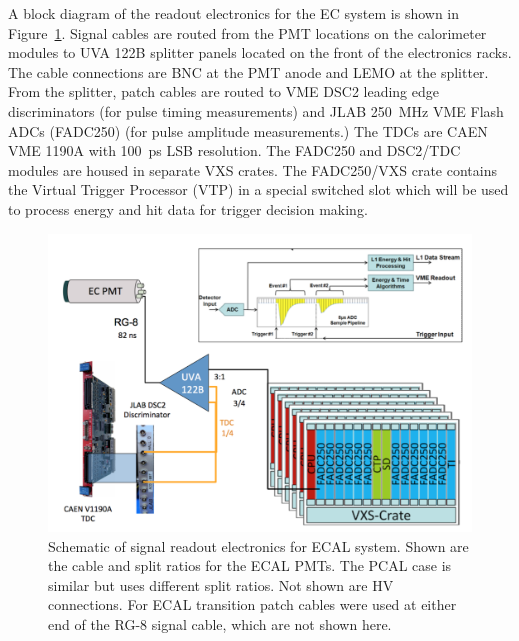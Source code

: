 \documentclass[letterpaper,10pt]{article}
\begin{document}
\newpage

A block diagram of the readout electronics for the EC system is shown in 
Figure~\ref{readout-elec}. Signal cables are routed from the PMT locations on the calorimeter
modules to UVA 122B splitter panels located on the front of the electronics racks. The cable
connections are BNC at the PMT anode and LEMO at the splitter.  From the splitter, patch cables
are routed to VME DSC2 leading edge discriminators (for pulse timing measurements) and JLAB 250~MHz VME Flash
ADCs (FADC250) (for pulse amplitude measurements.)  The TDCs are CAEN VME 1190A with 100~ps LSB resolution.
The FADC250 and DSC2/TDC modules are housed in separate VXS crates.  The FADC250/VXS crate contains the
Virtual Trigger Processor (VTP) in a special switched slot which will be used to process energy and hit data for
trigger decision making.

\begin{figure}[htbp]
  \centering
  \includegraphics[width= 7in, keepaspectratio = true]{readout-electronics}
  \vspace{2mm}
  \caption{Schematic of signal readout electronics for ECAL system.  Shown are the cable and split ratios for the ECAL
    PMTs.  The PCAL case is similar but uses different split ratios.  Not shown are HV connections.  For ECAL transition patch cables were used at either end of the RG-8 signal cable, which are not shown here.
  }
  \label{readout-elec} 
\end{figure}
\end{document}
